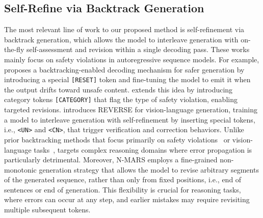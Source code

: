 \subsection{Self-Refine via Backtrack Generation}
The most relevant line of work to our proposed method is self-refinement via backtrack generation, which allows the model to interleave generation with on-the-fly self-assessment and revision within a single decoding pass.
These works mainly focus on safety violations in autoregressive sequence models.
For example, \citet{zhang2025backtracking} proposes a backtracking-enabled decoding mechanism for safer generation by introducing a special \texttt{[RESET]} token and fine-tuning the model to emit it when the output drifts toward unsafe content. 
\citet{selreinforcement} extends this idea by introducing category tokens \texttt{[CATEGORY]} that flag the type of safety violation, enabling targeted revisions.
\citet{wu2025generate} introduces REVERSE for vision-language generation, training a model to interleave generation with self-refinement by inserting special tokens, i.e., \texttt{<UN>} and \texttt{<CN>}, that trigger verification and correction behaviors. 
Unlike prior backtracking methods that focus primarily on safety violations~\cite{zhang2025backtracking,selreinforcement} or vision-language tasks~\cite{wu2025generate}, \modelname targets complex reasoning domains where error propagation is particularly detrimental. 
Moreover, N-MARS employs a fine-grained non-monotonic generation strategy that allows the model to revise arbitrary segments of the generated sequence, rather than only from fixed positions, i.e., end of sentences or end of generation.
This flexibility is crucial for reasoning tasks, where errors can occur at any step, and earlier mistakes may require revisiting multiple subsequent tokens.








